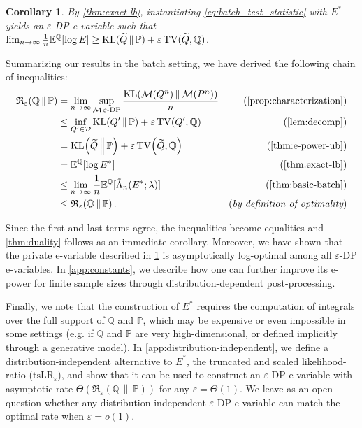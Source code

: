 \documentclass{article}
\DeclareMathOperator{\KLop}{KL}
\newcommand{\KL}[2]{%
  \mathchoice
    {\KLop\!\left(#1\,\middle\|\,#2\right)}%
    {\KLop(#1\,\Vert\,#2)}%
    {\KLop(#1\,\Vert\,#2)}%
    {\KLop(#1\,\Vert\,#2)}%
}
\newcommand{\Rdiv}[3][\eps]{%
  \mathfrak{R}_{#1}\!\left(#2\,\middle\|\,#3\right)%
}
\DeclareMathOperator{\TVop}{TV}
\newcommand{\TV}[2]{
  \mathchoice
    {\TVop\!\left(#1,#2\right)}%
    {\TVop(#1,#2)}%
    {\TVop(#1,#2)}%
    {\TVop(#1,#2)}%
}
\newcommand{\Null}{\mathbb{P}}
\newcommand{\E}{\mathbb{E}}
\newcommand{\Alt}{\mathbb{Q}}
\newcommand{\M}{\mathcal{M}}
\newcommand{\opt}{\Rdiv{\Alt}{\Null}}
\newcommand{\tsllr}{\text{tsLR}}
\newcommand{\eps}{\varepsilon}
\newtheorem{corollary}{Corollary}[theorem]
\begin{document}
\begin{corollary}\label{cor:optimal-stat}
    By \cref{thm:exact-lb}, instantiating \cref{eq:batch_test_statistic} with $E^*$ yields an $\eps$-DP e-variable such that $\lim_{n\to\infty} \frac{1}{n}\E^\Alt[\log E] \geq \KL{\widetilde Q}{\Null} + \eps \TV{\widetilde Q}{\Alt}$.
\end{corollary}

Summarizing our results in the batch setting, we have derived the following chain of inequalities:
\begin{align*}
    \opt 
    &= \lim_{n \to \infty} \sup_{\M\,\eps\text{-DP}} \frac{\KL{\M(Q^n)}{\M(P^n)}}{n} &(\cref{prop:characterization}) \\
    &\leq \inf_{Q' \in \mathcal{D}} \KL{Q'}{\Null} + \eps \TV{Q'}{\Alt} & (\cref{lem:decomp}) \\
    &= \KL{\widetilde Q}{\Null} + \eps \TV{\widetilde Q}{\Alt} & (\cref{thm:e-power-ub}) \\
    &= \E^\Alt[\log E^*] & (\cref{thm:exact-lb}) \\
    &\leq \lim_{n\to\infty} \frac{1}{n}\E^\Alt[\tilde \Lambda_n(E^*; \lambda)] & (\cref{thm:basic-batch}) \\
    &\leq \opt. & (\textit{by definition of optimality})
\end{align*}

Since the first and last terms agree, the inequalities become equalities and \cref{thm:duality} follows as an immediate corollary. Moreover, we have shown that the private e-variable described in \cref{cor:optimal-stat} is asymptotically log-optimal among all $\eps$-DP e-variables.
In \cref{app:constants}, we describe how one can further improve its e-power for finite sample sizes through distribution-dependent post-processing.

Finally, we note that the construction of $E^*$ requires the computation of integrals over the full support of $\Alt$ and $\Null$, which may be expensive or even impossible in some settings (e.g. if $\Alt$ and $\Null$ are very high-dimensional, or defined implicitly through a generative model). In \cref{app:distribution-independent}, we define a distribution-independent alternative to $E^*$, the truncated and scaled likelihood-ratio ($\tsllr_\eps$), and show that it can be used to construct an $\eps$-DP e-variable with asymptotic rate $\Theta(\opt)$ for any $\eps = \Theta(1)$. We leave as an open question whether any distribution-independent $\eps$-DP e-variable can match the optimal rate when $\eps = o(1)$.
\end{document}
